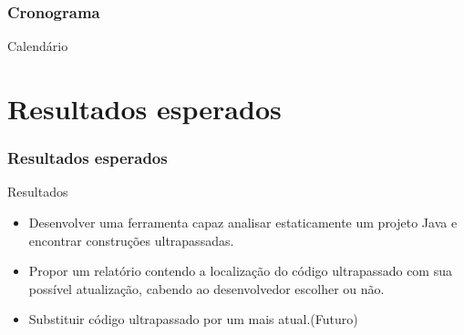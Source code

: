 \documentclass[]{beamer}
\begin{document}
	\begin{frame}[fragile]
		\frametitle{Cronograma}
		\begin{block}{Calendário}
			\begin{table}[ht]
				\centering
				\caption{Cronograma das atividades}
			\end{table}
		\end{block}
		
	\end{frame}
	

	\section{Resultados esperados}
	\begin{frame}[fragile, label=re]\frametitle{Resultados esperados}
		\begin{block}{Resultados}
			\begin{itemize}
				\item Desenvolver uma ferramenta capaz analisar estaticamente um projeto Java e encontrar construções ultrapassadas.
				
				\item Propor um relatório contendo a localização do código ultrapassado com sua possível atualização, cabendo ao desenvolvedor escolher ou não.
				
				\item Substituir código ultrapassado por um mais atual.(Futuro)
			\end{itemize}
		\end{block}
	\end{frame}
\end{document}
